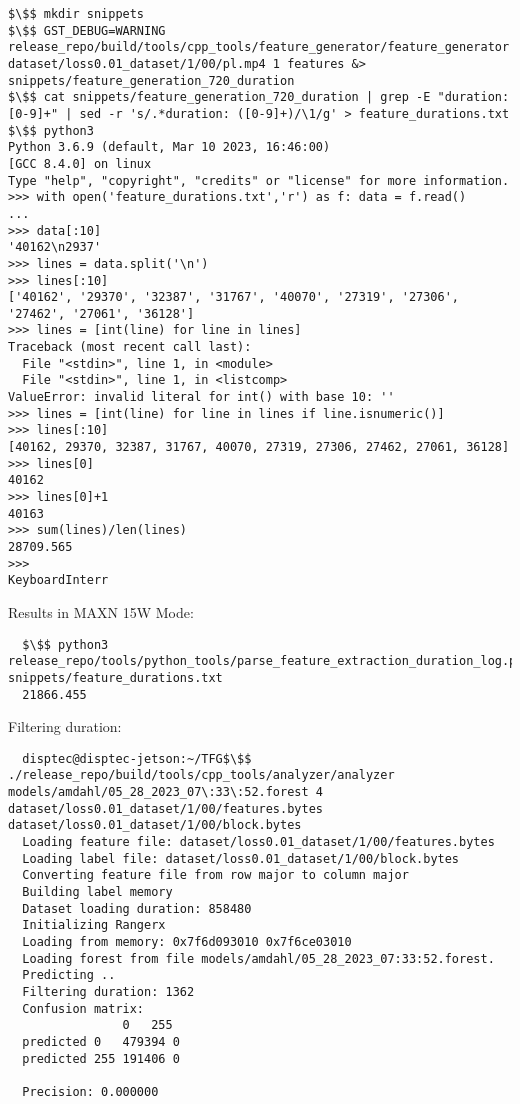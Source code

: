 \documentclass[12pt,oneside]{book}
\begin{document}
\begin{lstlisting}
$\$$ mkdir snippets
$\$$ GST_DEBUG=WARNING release_repo/build/tools/cpp_tools/feature_generator/feature_generator dataset/loss0.01_dataset/1/00/pl.mp4 1 features &> snippets/feature_generation_720_duration
$\$$ cat snippets/feature_generation_720_duration | grep -E "duration: [0-9]+" | sed -r 's/.*duration: ([0-9]+)/\1/g' > feature_durations.txt
$\$$ python3
Python 3.6.9 (default, Mar 10 2023, 16:46:00) 
[GCC 8.4.0] on linux
Type "help", "copyright", "credits" or "license" for more information.
>>> with open('feature_durations.txt','r') as f: data = f.read()
... 
>>> data[:10]
'40162\n2937'
>>> lines = data.split('\n')
>>> lines[:10]
['40162', '29370', '32387', '31767', '40070', '27319', '27306', '27462', '27061', '36128']
>>> lines = [int(line) for line in lines]
Traceback (most recent call last):
  File "<stdin>", line 1, in <module>
  File "<stdin>", line 1, in <listcomp>
ValueError: invalid literal for int() with base 10: ''
>>> lines = [int(line) for line in lines if line.isnumeric()]
>>> lines[:10]
[40162, 29370, 32387, 31767, 40070, 27319, 27306, 27462, 27061, 36128]
>>> lines[0]
40162
>>> lines[0]+1
40163
>>> sum(lines)/len(lines)
28709.565
>>> 
KeyboardInterr
\end{lstlisting}

Results in MAXN 15W Mode:
\begin{lstlisting}
  $\$$ python3 release_repo/tools/python_tools/parse_feature_extraction_duration_log.py snippets/feature_durations.txt 
  21866.455  
\end{lstlisting}

Filtering duration:
\begin{lstlisting}
  disptec@disptec-jetson:~/TFG$\$$ ./release_repo/build/tools/cpp_tools/analyzer/analyzer models/amdahl/05_28_2023_07\:33\:52.forest 4 dataset/loss0.01_dataset/1/00/features.bytes dataset/loss0.01_dataset/1/00/block.bytes 
  Loading feature file: dataset/loss0.01_dataset/1/00/features.bytes
  Loading label file: dataset/loss0.01_dataset/1/00/block.bytes
  Converting feature file from row major to column major
  Building label memory
  Dataset loading duration: 858480
  Initializing Rangerx
  Loading from memory: 0x7f6d093010 0x7f6ce03010
  Loading forest from file models/amdahl/05_28_2023_07:33:52.forest.
  Predicting ..
  Filtering duration: 1362
  Confusion matrix:
                0   255
  predicted 0   479394 0
  predicted 255 191406 0
  
  Precision: 0.000000  
\end{lstlisting}
\end{document}
